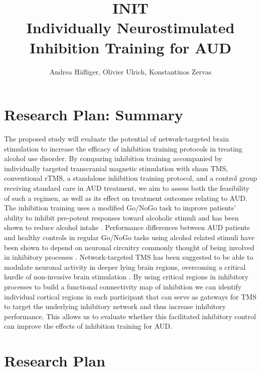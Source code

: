 \documentclass[12pt]{article}
\title{%
	INIT \\
	\large Individually Neurostimulated Inhibition Training for AUD}
\author{Andrea Häfliger, Olivier Ulrich, Konstantinos Zervas}
\begin{document}
\pagestyle{fancy}
\thispagestyle{empty}

\maketitle
\newpage
\tableofcontents
\newpage

\section{Research Plan: Summary}

The proposed study will evaluate the potential of network-targeted brain stimulation to increase the efficacy of inhibition training protocols in treating alcohol use disorder. By comparing inhibition training accompanied by individually targeted transcranial magnetic stimulation with sham TMS, conventional rTMS, a standalone inhibition training protocol, and a control group receiving standard care in AUD treatment, we aim to assess both the feasibility of such a regimen, as well as its effect on treatment outcomes relating to AUD. The inhibition training uses a modified Go/NoGo task to improve patients' ability to inhibit pre-potent responses toward alcoholic stimuli and has been shown to reduce alcohol intake \parencite{houbenBeerNogoLearning2012}. Performance differences between AUD patients and healthy controls in regular Go/NoGo tasks using alcohol related stimuli have been shown to depend on neuronal circuitry commonly thought of being involved in inhibitory processes \parencite{czaplaAlcoholdependentPatientsShow2017,volkowAddictionScienceUncovering2014,simmondsMetaanalysisGoNogo2008,luijtenSystematicReviewERP2014}. Network-targeted TMS has been suggested to be able to modulate neuronal activity in deeper lying brain regions, overcoming a critical hurdle of non-invasive brain stimulation \parencite{momiCognitiveEnhancementNetworkTargeted2020}. By using critical regions in inhibitory processes to build a functional connectivity map of inhibition we can identify individual cortical regions in each participant that can serve as gateways for TMS to target the underlying inhibitory network and thus increase inhibitory performance. This allows us to evaluate whether this facilitated inhibitory control can improve the effects of inhibition training for AUD.

\section{Research Plan}
\end{document}
